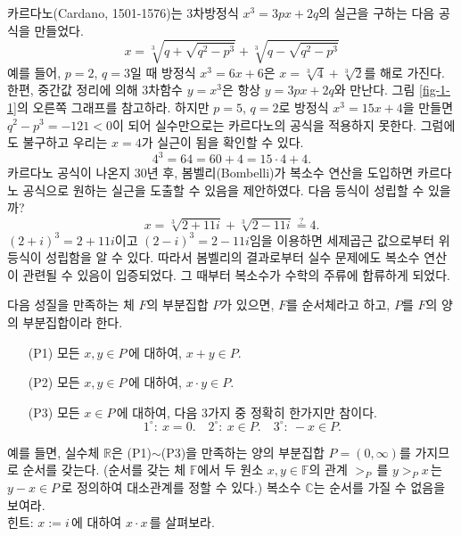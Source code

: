 카르다노(Cardano, 1501-1576)는 
3차방정식 $x^3=3px+2q$의 실근을 구하는 다음 공식을 만들었다.
$$
x = \sqrt[3]{q+ \sqrt{q^2-p^3}} + \sqrt[3]{q- \sqrt{q^2-p^3}}
$$
예를 들어, $p=2$, $q=3$일 때 방정식 $x^3=6x+6$은 $x=\sqrt[3]{4}+\sqrt[3]{2}$를 해로 가진다.
한편, 중간값 정리에 의해 3차함수 $y=x^3$은  항상 $y=3px+2q$와 만난다.
그림 \ref{fig-1-1}의 오른쪽 그래프를 참고하라.
하지만 $p=5$, $q=2$로 방정식 $x^3=15 x+4$을 만들면 $q^2-p^3= -121<0$이 되어
실수만으로는 카르다노의 공식을 적용하지 못한다.
그럼에도 불구하고 우리는 $x=4$가 실근이 됨을 확인할 수 있다.
$$
4^3 = 64 = 60 + 4 = 15\cdot 4 + 4.
$$
카르다노 공식이 나온지 30년 후, 봄벨리(Bombelli)가 복소수 연산을 도입하면
카르다노 공식으로 원하는 실근을 도출할 수 있음을 제안하였다.
다음 등식이 성립할 수 있을까?
$$
x = \sqrt[3]{2+11i} + \sqrt[3]{2-11i} \stackrel{?}{=} 4.
$$
$(2+i)^3 = 2+11i$이고 $(2-i)^3 = 2-11i$임을 이용하면
세제곱근 값으로부터 위 등식이 성립함을 알 수 있다.
따라서 봄벨리의 결과로부터 실수 문제에도 복소수 연산이 관련될 수 있음이 입증되었다.
그 때부터 복소수가 수학의 주류에 합류하게 되었다.

\begin{salt_exercise} \label{ex-1-3}
다음 성질을 만족하는 체 $F$의 부분집합 $P$가 있으면, $F$를 순서체라고 하고, $P$를 $F$의 양의 부분집합이라 한다.
\begin{itemize}[topsep=-0.5\parskip, leftmargin=50pt]
\item[(P1)] 모든 $x,y\in P\,$에 대하여, $x+y\in P$.
\item[(P2)] 모든 $x,y\in P\,$에 대하여, $x\cdot y \in P$.
\item[(P3)] 모든 $x\in P\,$에 대하여, 다음 3가지 중  정확히 한가지만 참이다.
$$
1^{\circ} : \ x=0. \quad 2^{\circ} : \ x\in P. \quad 3^{\circ} : \ -x\in P.
$$
\end{itemize}
예를 들면, 실수체 $\mathbb R$은 (P1)$\sim$(P3)을 만족하는 양의 부분집합
$P=(0,\infty)$를 가지므로 순서를 갖는다.
(순서를 갖는 체 $\mathbb F$에서 두 원소 $x,y\in \mathbb F$의 관계 $>_P\,$를
$y>_P x\,$는 $y-x \in P\,$로 정의하여 대소관계를 정할 수 있다.)
복소수 $\mathbb C$는 순서를 가질 수 없음을 보여라. \\[1ex]
힌트: $x:=i\,$에 대하여 $x\cdot x\,$를 살펴보라.
\end{salt_exercise}


